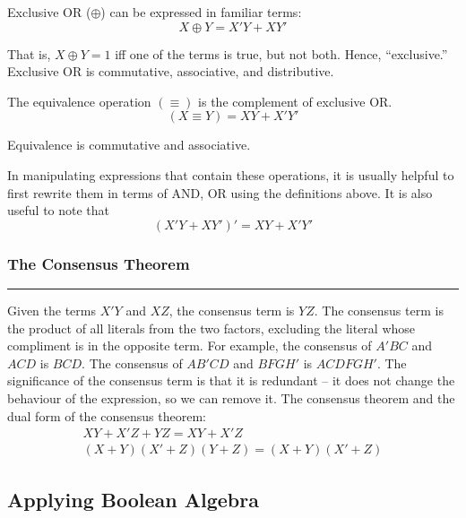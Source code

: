\documentclass{article}
\begin{document}
    \smallskip\noindent
    Exclusive OR ($\oplus$) can be expressed in familiar terms:
    \[
        X \oplus Y = X'Y + XY'
    \]

    \noindent
    That is, $X\oplus Y=1$  iff one of the terms is true, but not both.
    Hence, ``exclusive.''
    Exclusive OR is commutative, associative, and distributive.

    \smallskip\noindent
    The equivalence operation $(\equiv)$ is the complement of exclusive OR\@.
    \[
        (X\equiv Y) = XY+X'Y'
    \]

    \noindent
    Equivalence is commutative and associative.

    \smallskip\noindent
    In manipulating expressions that contain these operations, it is usually helpful to first rewrite them in terms of AND, OR using the definitions above.
    It is also useful to note that
    \[
        (X'Y+XY')'=XY+X'Y'
    \]

    \smallskip\noindent
    \subsubsection*{The Consensus Theorem}
    \vspace{-1em}
    \rule{\linewidth}{.1mm}

    \smallskip\noindent
    Given the terms $X'Y$ and $XZ$, the consensus term is $YZ$.
    The consensus term is the product of all literals from the two factors, excluding the literal whose compliment is in the opposite term.
    For example, the consensus of $A'BC$ and $ACD$ is $BCD$.
    The consensus of $AB'CD$ and $BFGH'$ is $ACDFGH'$.
    The significance of the consensus term is that it is redundant -- it does not change the behaviour of the expression, so we can remove it.
    The consensus theorem and the dual form of the consensus theorem:
    \begin{gather*}
        XY+X'Z+YZ=XY+X'Z                \\
        (X+Y)(X'+Z)(Y+Z)=(X+Y) (X'+Z)
    \end{gather*}

    \begin{center}
        \subsection*{Applying Boolean Algebra}
    \end{center}
\end{document}
